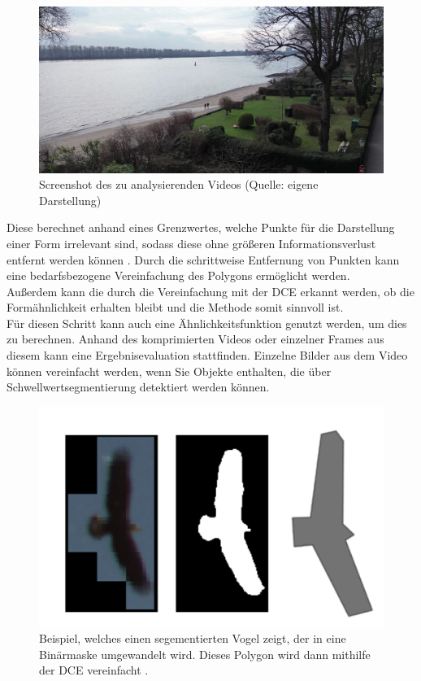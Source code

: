 \documentclass[a4paper,11pt,pdftex, parskip]{scrreprt}
\begin{document}
{  
\begin{figure}[ht]
    \centering
    \includegraphics[scale=0.2, keepaspectratio]{images/screenshot_video_moratz.png}
    \caption[Screenshot des zu analysierenden Videos]{Screenshot des zu analysierenden Videos (Quelle: eigene Darstellung)}
    \label{Scr_ges_Vid}
\end{figure}
Diese berechnet anhand eines Grenzwertes, welche Punkte für die Darstellung einer Form irrelevant sind, sodass diese ohne größeren Informationsverlust entfernt werden können \citep{Barkowsky2000}. Durch die schrittweise Entfernung von Punkten kann eine bedarfsbezogene Vereinfachung des Polygons ermöglicht werden. \\
Außerdem kann die durch die Vereinfachung mit der DCE erkannt werden, ob die Formähnlichkeit erhalten bleibt und die Methode somit sinnvoll ist. \\
Für diesen Schritt kann auch eine Ähnlichkeitsfunktion genutzt werden, um dies zu berechnen.
Anhand des komprimierten Videos oder einzelner Frames aus diesem kann eine Ergebnisevaluation stattfinden. Einzelne Bilder aus dem Video können vereinfacht werden, wenn Sie Objekte enthalten, die über Schwellwertsegmentierung detektiert werden können. \\
 
\begin{figure}[ht]
    \centering
    \includegraphics*[scale = 0.5, keepaspectratio]{images/Example_bird.png}
    \caption[Beispielablauf der Segmentierung und DCE aus \citet{Dorr2017}]{Beispiel, welches einen segementierten Vogel zeigt, der in eine Binärmaske umgewandelt wird. Dieses Polygon wird dann mithilfe der DCE vereinfacht \citep{Dorr2017}.}
    \label{Bsp_Dorr}
\end{figure}
}
\end{document}
